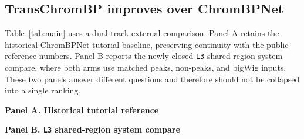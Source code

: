 \documentclass[11pt,a4paper]{article}
\begin{document}
\subsection{TransChromBP improves over ChromBPNet}
\label{sec:main-result}

Table~\ref{tab:main} uses a dual-track external comparison. Panel A
retains the historical ChromBPNet tutorial baseline, preserving
continuity with the public reference numbers. Panel B reports the newly
closed \texttt{L3} shared-region system compare, where both arms use matched
peaks, non-peaks, and bigWig inputs. These two panels answer different
questions and therefore should not be collapsed into a single ranking.

\begin{table}[H]
\centering
\small
\caption{\textbf{Dual-track external comparison.} Panel A retains the
historical tutorial reference; Panel B gives the matched \texttt{L3}
shared-region system compare.}
\label{tab:main}
\textbf{Panel A. Historical tutorial reference}\\[2mm]

\vspace{2mm}
\textbf{Panel B. \texttt{L3} shared-region system compare}\\[2mm]
\end{table}
\end{document}
